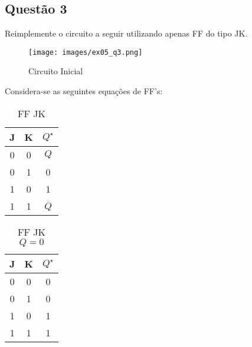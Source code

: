 \documentclass{article}
\begin{document}
\subsection{Questão 3}
    \begin{exercise}
        Reimplemente o circuito a seguir utilizando apenas FF do tipo JK.
        \begin{figure}[H]
            \centering
            \texttt{[image: images/ex05\_q3.png]}
            \caption{Circuito Inicial}
        \end{figure}
    \end{exercise}
    \begin{resolution}
        Considera-se as seguintes equações de FF's:
        \begin{center}
        \begin{minipage}{0.3\linewidth}
            \begin{table}[H]
            \centering\begin{tabular}[]{cc|c}
                J & K & $Q^\star$\\\hline
                0 & 0 & $Q$\\
                0 & 1 & 0\\
                1 & 0 & 1\\
                1 & 1 & $\overline{Q}$\\\hline
            \end{tabular}\caption{FF JK}
            \end{table}
        \end{minipage}
        \begin{minipage}{0.3\linewidth}
            \begin{table}[H]
                \centering\begin{tabular}[]{cc|c}
                    J & K & $Q^\star$\\\hline
                    0 & 0 & 0\\
                    0 & 1 & 0\\
                    1 & 0 & 1\\
                    1 & 1 & 1\\\hline
                \end{tabular}\caption{FF JK $Q=0$}
                \end{table}
        \end{minipage}
        \begin{minipage}{0.3\linewidth}
            \begin{table}[H]

\end{table}
\end{minipage}
\end{center}
\end{resolution}
\end{document}
